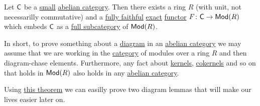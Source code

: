 \documentclass[../../main]{subfiles}
\begin{document}
\begin{theorem}\label{thm:freyd-mitchell}
  Let \(\mathsf{C}\) be a \hyperref[def:small-category]{small} \hyperref[def:abelian-category]{abelian category}.
  Then there exists a ring \(R\) (with unit, not necessarilly commutative) and a \hyperref[def:functor-types]{fully faithful} \hyperref[def:exact-functor]{exact} \hyperref[def:functor]{functor} \(F\colon \mathsf{C} \to \mathsf{Mod}(R)\) which embeds \(\mathsf{C}\) as a \hyperref[def:subcategory]{full subcategory} of \(\mathsf{Mod}(R)\).
\end{theorem}

In short, to prove something about a \hyperref[def:diagram]{diagram} in an \hyperref[def:abelian-category]{abelian category} we may assume that we are working in the \hyperref[def:category]{category} of modules over a ring \(R\) and then diagram-chase elements.
Furthermore, any fact about \hyperref[def:categorical-kernel]{kernels}, \hyperref[def:categorical-cokernel]{cokernels} and so on that holds in \(\mathsf{Mod}(R)\) also holds in any \hyperref[def:abelian-category]{abelian category}.


Using \hyperref[thm:freyd-mitchell]{this theorem} we can easilly prove two diagram lemmas that will make our lives easier later on.
\end{document}
